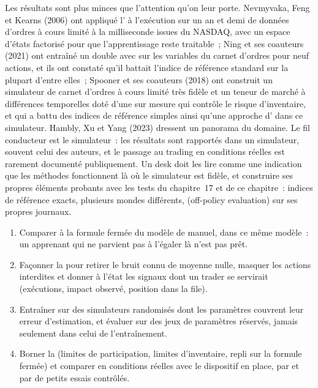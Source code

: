 Les résultats sont plus minces que l'attention qu'on leur porte. Nevmyvaka, Feng et Kearns (2006) ont appliqué l' à l'exécution sur
un an et demi de données d'ordres à cours limité à la milliseconde issues du NASDAQ, avec un espace d'états factorisé pour que l'apprentissage reste traitable~;
Ning et ses coauteurs (2021) ont entraîné un double  avec  sur les variables du carnet d'ordres pour neuf actions, et
ils ont constaté qu'il battait l'indice de référence standard sur la plupart d'entre elles~; Spooner et ses coauteurs
(2018) ont construit un simulateur de carnet d'ordres à cours limité très fidèle et un teneur de marché à différences temporelles doté d'une  sur mesure qui
contrôle le risque d'inventaire, et qui a battu des indices de référence simples ainsi qu'une approche d' dans ce simulateur. Hambly, Xu et Yang
(2023) dressent un panorama du domaine. Le fil conducteur est le simulateur~: les résultats sont rapportés dans un simulateur, souvent celui des auteurs, et
le passage au trading en conditions réelles est rarement documenté publiquement. Un desk doit les lire comme une indication que les méthodes fonctionnent là où
le simulateur est fidèle, et construire ses propres éléments probants avec les tests du chapitre~17 et de ce chapitre~: indices de référence exacts, plusieurs
mondes différents,  (off-policy evaluation) sur ses propres journaux.

\begin{method}\label{met:ml:rlt:method}
\begin{enumerate}
\item Comparer à la formule fermée du modèle de manuel, dans ce même modèle~: un apprenant qui ne parvient pas à l'égaler là n'est pas
prêt.
\item Façonner la  pour retirer le bruit connu de moyenne nulle, masquer les actions interdites et donner à l'état les signaux dont un
trader se servirait (exécutions, impact observé, position dans la file).
\item Entraîner sur des simulateurs randomisés dont les paramètres couvrent leur erreur d'estimation, et évaluer sur des jeux de paramètres
réservés, jamais seulement dans celui de l'entraînement.
\item Borner la  (limites de participation, limites d'inventaire, repli sur la formule fermée) et comparer en conditions réelles avec
le dispositif en place, par  et par de petits essais contrôlés.
\end{enumerate}
\end{method}

